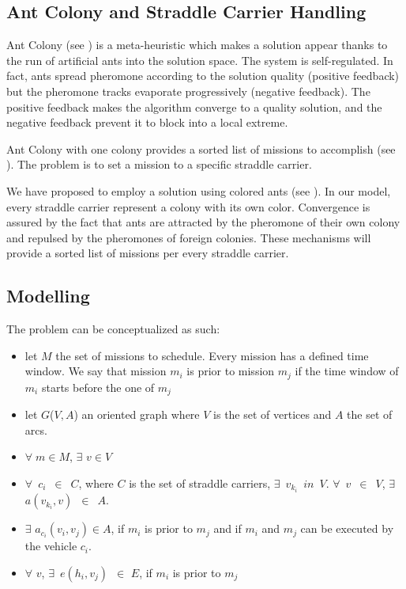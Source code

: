 \documentclass[a4paper,10pt]{article}
\begin{document}
\begin{multicols}{2}
\section{Ant Colony and Straddle Carrier Handling}
Ant Colony (see \cite{Dorigo91,Dorigo97}) is a meta-heuristic which makes a solution appear thanks to the run of artificial ants into the solution space. The system is self-regulated. In fact, ants spread pheromone according to the solution quality (positive feedback) but the pheromone tracks evaporate progressively (negative feedback). The positive feedback makes the algorithm converge to a quality solution, and the negative feedback prevent it to block into a local extreme.

Ant Colony with one colony provides a sorted list of missions to accomplish (see \cite{Montemanni04,Bullnheimer97,Bullnheimer99}). The problem is to set a mission to a specific straddle carrier.

We have proposed to employ a solution using colored ants (see \cite{Bertelle02}). In our model, every straddle carrier represent a colony with its own color. Convergence is assured by the fact that ants are attracted by the pheromone of their own colony and repulsed by the pheromones of foreign colonies. These mechanisms will provide a sorted list of missions per every straddle carrier.

\subsection{Modelling}

The problem can be conceptualized as such:
\begin{itemize}
	\item let $M$ the set of missions to schedule. Every mission has a defined time window. We say that mission $m_i$ is prior to mission $m_j$ if the time window of $m_i$ starts before the one of $m_j$
	\item let $G$($V,A$) an oriented graph where $V$ is the set of vertices and $A$ the set of arcs.
	\item $\forall \; m \in M$, $\exists$ $v \in V$
	\item $\forall$~$c_i$~$\in$~$C$, where $C$ is the set of straddle carriers, $\exists$~$v_{k_i}$~$in$~$V$. $\forall$~$v$~$\in$~$V$, $\exists$~$a(v_{k_i},v)$~$\in$~$A$.
	\item $\exists$ $a_{c_i}(v_i , v_j) \in A$, if $m_i$ is prior to $m_j$ and if $m_i$ and $m_j$ can be executed by the vehicle $c_i$.	
	\item $\forall$ $v$, $\exists$~$e(h_i , v_j)$~$\in$ $E$, if $m_i$ is prior to $m_j$	
\end{itemize}


\end{multicols}
\end{document}
